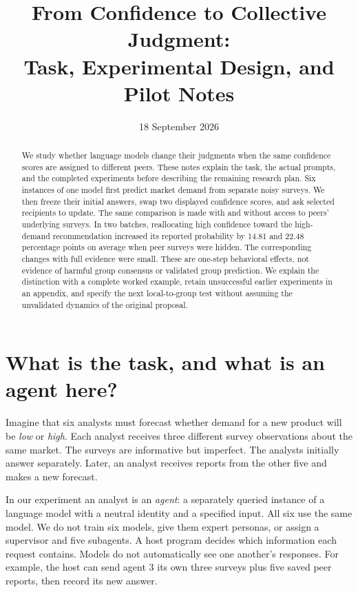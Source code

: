 \documentclass[11pt]{article}
\title{From Confidence to Collective Judgment:\\Task, Experimental Design, and Pilot Notes}
\author{}
\date{18 September 2026}
\begin{document}
\maketitle
\begin{abstract}
We study whether language models change their judgments when the same confidence scores are assigned to different peers. These notes explain the task, the actual prompts, and the completed experiments before describing the remaining research plan. Six instances of one model first predict market demand from separate noisy surveys. We then freeze their initial answers, swap two displayed confidence scores, and ask selected recipients to update. The same comparison is made with and without access to peers' underlying surveys. In two batches, reallocating high confidence toward the high-demand recommendation increased its reported probability by 14.81 and 22.48 percentage points on average when peer surveys were hidden. The corresponding changes with full evidence were small. These are one-step behavioral effects, not evidence of harmful group consensus or validated group prediction. We explain the distinction with a complete worked example, retain unsuccessful earlier experiments in an appendix, and specify the next local-to-group test without assuming the unvalidated dynamics of the original proposal.
\end{abstract}

\section{What is the task, and what is an agent here?}
\label{sec:task}
Imagine that six analysts must forecast whether demand for a new product will be \emph{low} or \emph{high}. Each analyst receives three different survey observations about the same market. The surveys are informative but imperfect. The analysts initially answer separately. Later, an analyst receives reports from the other five and makes a new forecast.

In our experiment an analyst is an \emph{agent}: a separately queried instance of a language model with a neutral identity and a specified input. All six use the same model. We do not train six models, give them expert personas, or assign a supervisor and five subagents. A host program decides which information each request contains. Models do not automatically see one another's responses. For example, the host can send agent 3 its own three surveys plus five saved peer reports, then record its new answer.
\end{document}
